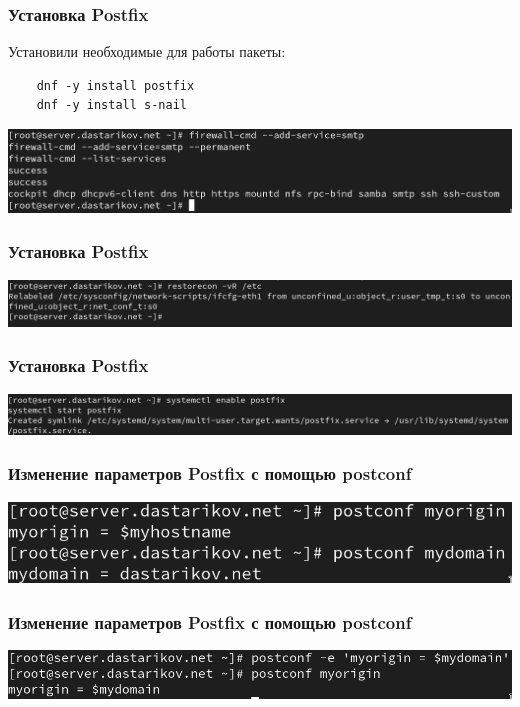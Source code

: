 \begin{frame}[containsverbatim]
\frametitle{Установка Postfix}
Установили необходимые для работы пакеты:
\begin{verbatim}
    dnf -y install postfix
    dnf -y install s-nail
\end{verbatim}
    \centering
    \includegraphics[width=\textwidth]{../images/image01.png}
\end{frame}
\begin{frame}
\frametitle{Установка Postfix}
    \centering
    \includegraphics[width=\textwidth]{../images/image02.png}
\end{frame}
\begin{frame}
\frametitle{Установка Postfix}
    \centering
    \includegraphics[width=\textwidth]{../images/image06.png}
\end{frame}
\begin{frame}
\frametitle{Изменение параметров Postfix с помощью postconf}
    \centering
    \includegraphics[width=\textwidth]{../images/image03.png}
\end{frame}
\begin{frame}
\frametitle{Изменение параметров Postfix с помощью postconf}
    \centering
    \includegraphics[width=\textwidth]{../images/image04.png}
\end{frame}
